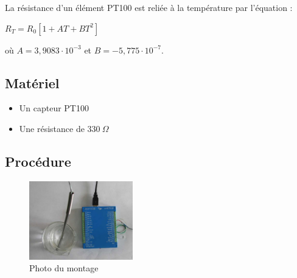 \documentclass{book}
\begin{document}
La résistance d'un élément PT100 est reliée à la température par l'équation :



$R_{T}=R_{0}\left[1+AT+BT^{2}\right]$



où $A=3,9083\cdot10^{-3}$  et $B=-5,775\cdot10^{-7}$.

\subsection{Matériel}


\begin{itemize}
  \item Un capteur PT100
  \item Une résistance de $330\ \Omega$
\end{itemize}

\subsection{Procédure}


\begin{figure}[h!]
\begin{center}
\caption{\label{}Photo du montage }\vspace{0.5em}
\includegraphics[width=0.4\textwidth, height=0.3\textwidth, keepaspectratio]{Pic-cooling-water-photo.png}
\end{center}
\end{figure}
\end{document}
